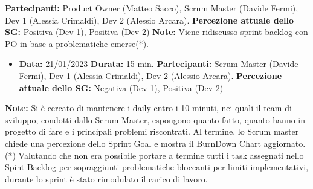 \documentclass[a4paper, oneside]{article}
\newcommand\due{Scrum Master (Davide Fermi), Dev 1 (Alessia Crimaldi), Dev 2 (Alessio Arcara).}
\newcommand\dueP{Product Owner (Matteo Sacco), }
\begin{document}
\begin{landscape}
\begin{itemize}
            \newline \textbf{Partecipanti:} \dueP \due
            \newline \textbf{Percezione attuale dello SG:} Positiva (Dev 1), Positiva (Dev 2)
            \newline \textbf{Note:} Viene ridiscusso sprint backlog con PO in base a problematiche emerse(*).
        \end{itemize}
        \begin{itemize}
            \item \textbf{Data:} 21/01/2023
            \newline \textbf{Durata:} 15 min.
            \newline \textbf{Partecipanti:} \due
            \newline \textbf{Percezione attuale dello SG:} Negativa (Dev 1), Positiva (Dev 2)
        \end{itemize}
        \textbf{Note:} Si è cercato di mantenere i daily entro i 10 minuti, nei quali il team di sviluppo, condotti dallo Scrum Master, espongono quanto fatto, quanto hanno in progetto di fare e i principali problemi riscontrati. Al termine, lo Scrum master chiede una percezione dello Sprint Goal e mostra il BurnDown Chart aggiornato. \\
        (*) Valutando che non era possibile portare a termine tutti i task assegnati nello Spint Backlog per sopraggiunti problematiche bloccanti per limiti implementativi, durante lo sprint è stato rimodulato il carico di lavoro.

        \newpage
        \newpage

\end{landscape}
\end{document}
